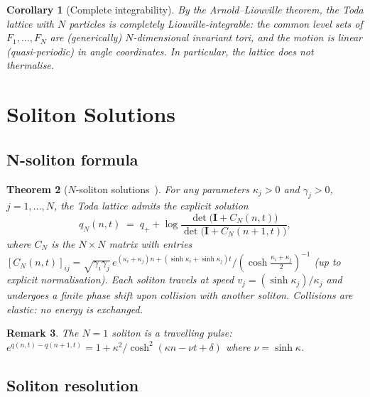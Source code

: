 \documentclass[12pt,a4paper]{article}
\newtheorem{theorem}{Theorem}[section]
\newtheorem{corollary}[theorem]{Corollary}
\newtheorem{remark}[theorem]{Remark}
\theoremstyle{definition}
\begin{document}
\begin{corollary}[Complete integrability]
By the Arnold--Liouville theorem, the Toda lattice with $N$ particles is
completely Liouville-integrable: the common level sets of $F_1,\ldots,F_N$
are (generically) $N$-dimensional invariant tori, and the motion is linear
(quasi-periodic) in angle coordinates.  In particular, the lattice does
\emph{not} thermalise.
\end{corollary}

\section{Soliton Solutions}

\subsection{N-soliton formula}

\begin{theorem}[$N$-soliton solutions~\cite{Hirota1973,Toda1989}]
For any parameters $\kappa_j > 0$ and $\gamma_j > 0$,
$j=1,\ldots,N$, the Toda lattice admits the explicit solution
\begin{equation}\label{eq:Nsoliton}
  q_N(n,t) \;=\; q_+ + \log\frac{\det\!\bigl(\mathbf{I}+C_N(n,t)\bigr)}
                                  {\det\!\bigl(\mathbf{I}+C_N(n+1,t)\bigr)},
\end{equation}
where $C_N$ is the $N\times N$ matrix with entries
$[C_N(n,t)]_{ij} = \sqrt{\gamma_i\gamma_j}\,
e^{(\kappa_i+\kappa_j)n + (\sinh\kappa_i+\sinh\kappa_j)t}/
(\cosh\tfrac{\kappa_i+\kappa_j}{2})^{-1}$ (up to explicit normalisation).
Each soliton travels at speed $v_j = (\sinh\kappa_j)/\kappa_j$ and
undergoes a finite phase shift upon collision with another soliton.
Collisions are \emph{elastic}: no energy is exchanged.
\end{theorem}

\begin{remark}
The $N=1$ soliton is a travelling pulse:
$e^{q(n,t)-q(n+1,t)} = 1 + \kappa^2/\cosh^2(\kappa n - \nu t + \delta)$
where $\nu = \sinh\kappa$.
\end{remark}

\subsection{Soliton resolution}
\end{document}
